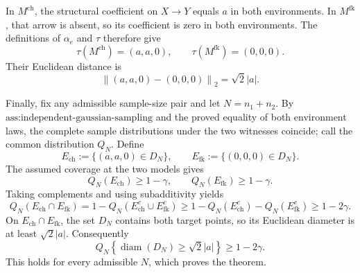 In \(M^{\mathrm{ch}}\), the structural coefficient on \(X\to Y\) equals \(a\) in both environments. In \(M^{\mathrm{fk}}\), that arrow is absent, so its coefficient is zero in both environments. The definitions of \(\alpha_e\) and \(\tau\) therefore give
\[
 \tau(M^{\mathrm{ch}})=(a,a,0),
 \qquad
 \tau(M^{\mathrm{fk}})=(0,0,0).
\]
Their Euclidean distance is
\[
 \left\|(a,a,0)-(0,0,0)\right\|_2=\sqrt2\lvert a\rvert.
\]

Finally, fix any admissible sample-size pair and let \(N=n_1+n_2\). By \(\text{ass:independent-gaussian-sampling}\) and the proved equality of both environment laws, the complete sample distributions under the two witnesses coincide; call the common distribution \(Q_N\). Define
\[
 E_{\mathrm{ch}}:=\{(a,a,0)\in D_N\},
 \qquad
 E_{\mathrm{fk}}:=\{(0,0,0)\in D_N\}.
\]
The assumed coverage at the two models gives
\[
 Q_N(E_{\mathrm{ch}})\ge1-\gamma,
 \qquad
 Q_N(E_{\mathrm{fk}})\ge1-\gamma.
\]
Taking complements and using subadditivity yields
\[
 Q_N(E_{\mathrm{ch}}\cap E_{\mathrm{fk}})
 =1-Q_N(E_{\mathrm{ch}}^c\cup E_{\mathrm{fk}}^c)
 \ge1-Q_N(E_{\mathrm{ch}}^c)-Q_N(E_{\mathrm{fk}}^c)
 \ge1-2\gamma.
\]
On \(E_{\mathrm{ch}}\cap E_{\mathrm{fk}}\), the set \(D_N\) contains both target points, so its Euclidean diameter is at least \(\sqrt2\lvert a\rvert\). Consequently
\[
 Q_N\!\left\{\operatorname{diam}(D_N)\ge\sqrt2\lvert a\rvert\right\}
 \ge1-2\gamma.
\]
This holds for every admissible \(N\), which proves the theorem.
